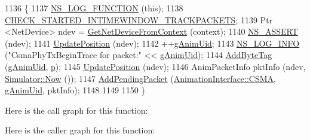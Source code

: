 \begin{DoxyCode}
1136 \{
1137   \hyperlink{log-macros-disabled_8h_a90b90d5bad1f39cb1b64923ea94c0761}{NS\_LOG\_FUNCTION} (\textcolor{keyword}{this});
1138   \hyperlink{animation-interface_8h_acdf351a3155a6ccf1813189e10dba8f5}{CHECK\_STARTED\_INTIMEWINDOW\_TRACKPACKETS};
1139   Ptr <NetDevice> ndev = \hyperlink{classns3_1_1AnimationInterface_a5054e94f0c5e3d0a4443cfbe52e2ea30}{GetNetDeviceFromContext} (context);
1140   \hyperlink{assert_8h_a6dccdb0de9b252f60088ce281c49d052}{NS\_ASSERT} (ndev);
1141   \hyperlink{classns3_1_1AnimationInterface_ab751cf6f459289f0978f4bb97b93044d}{UpdatePosition} (ndev);
1142   ++\hyperlink{classns3_1_1AnimationInterface_a98ecb4d4c024e52171b3154f09b7bcc2}{gAnimUid};
1143   \hyperlink{group__logging_gafbd73ee2cf9f26b319f49086d8e860fb}{NS\_LOG\_INFO} (\textcolor{stringliteral}{"CsmaPhyTxBeginTrace for packet:"} << \hyperlink{classns3_1_1AnimationInterface_a98ecb4d4c024e52171b3154f09b7bcc2}{gAnimUid});
1144   \hyperlink{classns3_1_1AnimationInterface_a7963c89df19cb9a145f16a369e83ec9c}{AddByteTag} (\hyperlink{classns3_1_1AnimationInterface_a98ecb4d4c024e52171b3154f09b7bcc2}{gAnimUid}, \hyperlink{lte__link__budget_8m_ac9de518908a968428863f829398a4e62}{p});
1145   \hyperlink{classns3_1_1AnimationInterface_ab751cf6f459289f0978f4bb97b93044d}{UpdatePosition} (ndev);
1146   AnimPacketInfo pktInfo (ndev, \hyperlink{classns3_1_1Simulator_ac3178fa975b419f7875e7105be122800}{Simulator::Now} ());
1147   \hyperlink{classns3_1_1AnimationInterface_ab7f3bc1843610f2d9514ddf5d756eaa5}{AddPendingPacket} (\hyperlink{classns3_1_1AnimationInterface_a801a4efd553ff0d1d768cd70d22456b6a5fb0f9f61327638f165213b90492cfa7}{AnimationInterface::CSMA}, 
      \hyperlink{classns3_1_1AnimationInterface_a98ecb4d4c024e52171b3154f09b7bcc2}{gAnimUid}, pktInfo);
1148 
1149 
1150 \}
\end{DoxyCode}


Here is the call graph for this function\+:




Here is the caller graph for this function\+:


